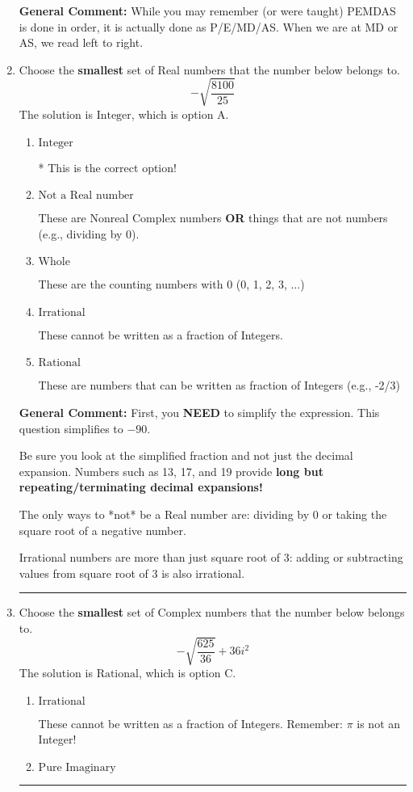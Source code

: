 \documentclass{extbook}[14pt]
\newcommand{\litem}[1]{\item #1

\rule{\textwidth}{0.4pt}}
\begin{document}
\begin{enumerate}
{\textbf{General Comment:} While you may remember (or were taught) PEMDAS is done in order, it is actually done as P/E/MD/AS. When we are at MD or AS, we read left to right.
}
\litem{
Choose the \textbf{smallest} set of Real numbers that the number below belongs to.
\[ -\sqrt{\frac{8100}{25}} \]The solution is \( \text{Integer} \), which is option A.\begin{enumerate}[label=\Alph*.]
\item \( \text{Integer} \)

* This is the correct option!
\item \( \text{Not a Real number} \)

These are Nonreal Complex numbers \textbf{OR} things that are not numbers (e.g., dividing by 0).
\item \( \text{Whole} \)

These are the counting numbers with 0 (0, 1, 2, 3, ...)
\item \( \text{Irrational} \)

These cannot be written as a fraction of Integers.
\item \( \text{Rational} \)

These are numbers that can be written as fraction of Integers (e.g., -2/3)
\end{enumerate}

\textbf{General Comment:} First, you \textbf{NEED} to simplify the expression. This question simplifies to $-90$. 
 
 Be sure you look at the simplified fraction and not just the decimal expansion. Numbers such as 13, 17, and 19 provide \textbf{long but repeating/terminating decimal expansions!} 
 
 The only ways to *not* be a Real number are: dividing by 0 or taking the square root of a negative number. 
 
 Irrational numbers are more than just square root of 3: adding or subtracting values from square root of 3 is also irrational.
}
\litem{
Choose the \textbf{smallest} set of Complex numbers that the number below belongs to.
\[ -\sqrt{\frac{625}{36}} + 36i^2 \]The solution is \( \text{Rational} \), which is option C.\begin{enumerate}[label=\Alph*.]
\item \( \text{Irrational} \)

These cannot be written as a fraction of Integers. Remember: $\pi$ is not an Integer!
\item \( \text{Pure Imaginary} \)


\end{enumerate}}
\end{enumerate}
\end{document}
